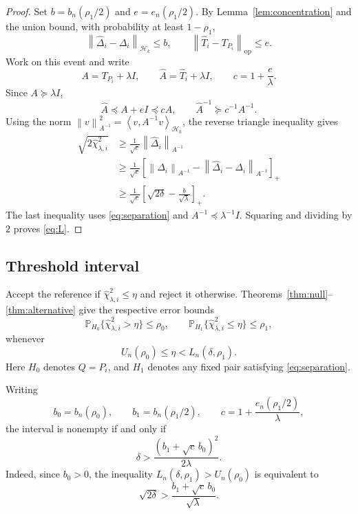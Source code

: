 \documentclass[11pt,a4paper]{article}
\newcommand{\HH}{\mathcal H_k}
\newcommand{\Prob}{\mathbb P}
\newcommand{\norm}[1]{\left\lVert #1\right\rVert}
\newcommand{\inner}[2]{\left\langle #1,#2\right\rangle}
\newcommand{\op}{\mathrm{op}}
\begin{document}
\begin{proof}
Set $b=b_n(\rho_1/2)$ and $e=e_n(\rho_1/2)$.
By Lemma~\ref{lem:concentration} and the union bound,
with probability at least $1-\rho_1$,
\[
    \norm{\widehat\Delta_i-\Delta_i}_{\HH}\le b,
    \qquad
    \norm{\widehat T_i-T_{P_i}}_{\op}\le e.
\]
Work on this event and write
\[
    A=T_{P_i}+\lambda I,
    \qquad
    \widehat A=\widehat T_i+\lambda I,
    \qquad
    c=1+\frac e\lambda.
\]
Since $A\succeq\lambda I$,
\[
    \widehat A\preceq A+eI\preceq cA,
    \qquad
    \widehat A^{-1}\succeq c^{-1}A^{-1}.
\]
Using the norm
$\norm{v}_{A^{-1}}^2=\inner{v}{A^{-1}v}_{\HH}$,
the reverse triangle inequality gives
\begin{align*}
    \sqrt{2\widehat\chi^2_{\lambda,i}}
    &\ge
    \frac1{\sqrt c}\norm{\widehat\Delta_i}_{A^{-1}}\\
    &\ge
    \frac1{\sqrt c}
    \left[
        \norm{\Delta_i}_{A^{-1}}
        -
        \norm{\widehat\Delta_i-\Delta_i}_{A^{-1}}
    \right]_+\\
    &\ge
    \frac1{\sqrt c}
    \left[
        \sqrt{2\delta}-\frac b{\sqrt\lambda}
    \right]_+.
\end{align*}
The last inequality uses \eqref{eq:separation} and
$A^{-1}\preceq\lambda^{-1}I$.
Squaring and dividing by $2$ proves \eqref{eq:L}.
\end{proof}

\subsection{Threshold interval}

Accept the reference if
$\widehat\chi^2_{\lambda,i}\le\eta$
and reject it otherwise.
Theorems~\ref{thm:null}--\ref{thm:alternative}
give the respective error bounds
\[
    \Prob_{H_0}
    \{\widehat\chi^2_{\lambda,i}>\eta\}\le\rho_0,
    \qquad
    \Prob_{H_1}
    \{\widehat\chi^2_{\lambda,i}\le\eta\}\le\rho_1,
\]
whenever
\begin{equation}\label{eq:threshold-interval}
    U_n(\rho_0)\le\eta<L_n(\delta,\rho_1).
\end{equation}
Here $H_0$ denotes $Q=P_i$, and $H_1$ denotes any
fixed pair satisfying \eqref{eq:separation}.

Writing
\[
    b_0=b_n(\rho_0),
    \qquad
    b_1=b_n(\rho_1/2),
    \qquad
    c=1+\frac{e_n(\rho_1/2)}{\lambda},
\]
the interval is nonempty if and only if
\begin{equation}\label{eq:threshold-separation}
    \boxed{
    \delta>\frac{(b_1+\sqrt c\,b_0)^2}{2\lambda}.
    }
\end{equation}
Indeed, since $b_0>0$, the inequality
$L_n(\delta,\rho_1)>U_n(\rho_0)$ is equivalent to
\[
    \sqrt{2\delta}
    >
    \frac{b_1+\sqrt c\,b_0}{\sqrt\lambda}.
\]
\end{document}
